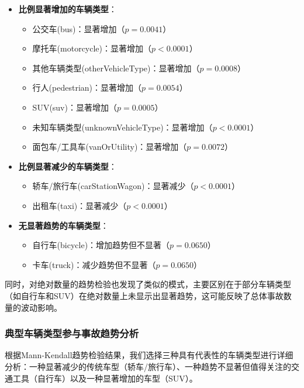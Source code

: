 \documentclass[12pt,a4paper]{article}
\begin{document}
\begin{itemize}
\item \textbf{比例显著增加的车辆类型}：
  \begin{itemize}
  \item 公交车(bus)：显著增加（$p = 0.0041$）
  \item 摩托车(motorcycle)：显著增加（$p < 0.0001$）
  \item 其他车辆类型(otherVehicleType)：显著增加（$p = 0.0008$）
  \item 行人(pedestrian)：显著增加（$p = 0.0054$）
  \item SUV(suv)：显著增加（$p = 0.0005$）
  \item 未知车辆类型(unknownVehicleType)：显著增加（$p < 0.0001$）
  \item 面包车/工具车(vanOrUtility)：显著增加（$p = 0.0072$）
  \end{itemize}

\item \textbf{比例显著减少的车辆类型}：
  \begin{itemize}
  \item 轿车/旅行车(carStationWagon)：显著减少（$p < 0.0001$）
  \item 出租车(taxi)：显著减少（$p < 0.0001$）
  \end{itemize}

\item \textbf{无显著趋势的车辆类型}：
  \begin{itemize}
  \item 自行车(bicycle)：增加趋势但不显著（$p = 0.0650$）
  \item 卡车(truck)：减少趋势但不显著（$p = 0.0650$）
  \end{itemize}
\end{itemize}

同时，对绝对数量的趋势检验也发现了类似的模式，主要区别在于部分车辆类型（如自行车和SUV）在绝对数量上未显示出显著趋势，这可能反映了总体事故数量的波动影响。

\subsubsection{典型车辆类型参与事故趋势分析}

根据Mann-Kendall趋势检验结果，我们选择三种具有代表性的车辆类型进行详细分析：一种显著减少的传统车型（轿车/旅行车）、一种趋势不显著但值得关注的交通工具（自行车）以及一种显著增加的车型（SUV）。
\end{document}
